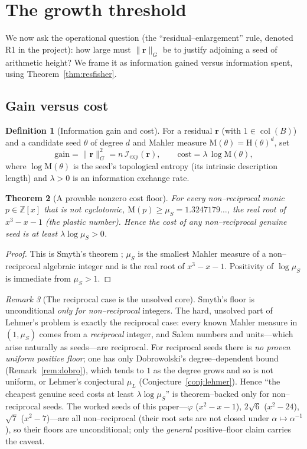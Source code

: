 \documentclass[11pt]{article}
\theoremstyle{plain}
\newtheorem{theorem}{Theorem}[section]
\theoremstyle{definition}
\newtheorem{definition}[theorem]{Definition}
\theoremstyle{remark}
\newtheorem{remark}[theorem]{Remark}
\newcommand{\Z}{\mathbb{Z}}
\newcommand{\Mah}{\mathrm{M}}
\newcommand{\height}{\mathrm{H}}
\newcommand{\Fish}{\mathcal{I}}
\newcommand{\rr}{\mathbf{r}}
\newcommand{\GG}{G}
\newcommand{\BB}{B}
\newcommand{\inv}{^{-1}}
\DeclareMathOperator{\col}{col}
\begin{document}
\section{The growth threshold}\label{sec:threshold}

We now ask the operational question (the ``residual--enlargement'' rule, denoted R1 in the project): how
large must $\lVert\rr\rVert_{\GG}$ be to justify adjoining a seed of arithmetic height? We frame it as
information gained versus information spent, using Theorem~\ref{thm:resfisher}.

\subsection{Gain versus cost}
\begin{definition}[Information gain and cost]\label{def:gaincost}
For a residual $\rr$ (with $1\in\col(\BB)$) and a candidate seed $\theta$ of degree $d$ and Mahler measure
$\Mah(\theta)=\height(\theta)^d$, set
\[
  \mathrm{gain}=\lVert\rr\rVert_{\GG}^2=n\,\Fish_{\mathrm{exp}}(\rr),\qquad
  \mathrm{cost}=\lambda\,\log\Mah(\theta),
\]
where $\log\Mah(\theta)$ is the seed's topological entropy \cite{LSW} (its intrinsic description length) and
$\lambda>0$ is an information exchange rate.
\end{definition}

\begin{theorem}[A provable nonzero cost floor]\label{thm:smythfloor}
For every non--reciprocal monic $p\in\Z[x]$ that is not cyclotomic, $\Mah(p)\ge\mu_S=1.3247179\ldots$, the
real root of $x^3-x-1$ (the plastic number). Hence the cost of any non--reciprocal genuine seed is at least
$\lambda\log\mu_S>0$.
\end{theorem}
\begin{proof}
This is Smyth's theorem \cite{Smyth}; $\mu_S$ is the smallest Mahler measure of a non--reciprocal algebraic
integer and is the real root of $x^3-x-1$. Positivity of $\log\mu_S$ is immediate from $\mu_S>1$.
\end{proof}

\begin{remark}[The reciprocal case is the unsolved core]\label{rem:reciprocal}
Smyth's floor is unconditional \emph{only for non--reciprocal} integers. The hard, unsolved part of Lehmer's
problem is exactly the reciprocal case: every known Mahler measure in $(1,\mu_S)$ comes from a
\emph{reciprocal} integer, and Salem numbers and units---which arise naturally as seeds---are reciprocal. For
reciprocal seeds there is \emph{no proven uniform positive floor}; one has only Dobrowolski's
degree--dependent bound (Remark~\ref{rem:dobro}), which tends to $1$ as the degree grows and so is not
uniform, or Lehmer's conjectural $\mu_L$ (Conjecture~\ref{conj:lehmer}). Hence ``the cheapest genuine seed
costs at least $\lambda\log\mu_S$'' is theorem--backed only for non--reciprocal seeds. The worked seeds of
this paper---$\varphi$ ($x^2-x-1$), $2\sqrt6$ ($x^2-24$), $\sqrt7$ ($x^2-7$)---are all non--reciprocal (their
root sets are not closed under $\alpha\mapsto\alpha\inv$), so their floors are unconditional; only the
\emph{general} positive--floor claim carries the caveat.
\end{remark}
\end{document}
